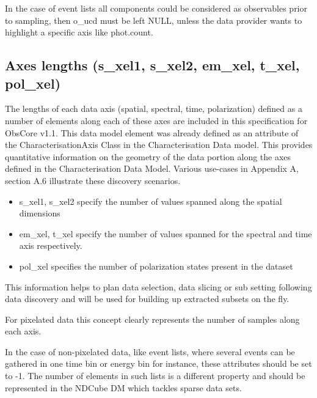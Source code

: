 \documentclass[11pt,a4paper]{ivoa}
\begin{document}
In the case of event lists all components could be considered as observables prior to sampling, then o\_ucd must be left
NULL, unless the data provider wants to highlight a specific axis like phot.count.

\subsection{Axes lengths (s\_xel1, s\_xel2, em\_xel, t\_xel, pol\_xel)}
The lengths of each data axis (spatial, spectral, time, polarization) defined as a number of elements along each of
these axes are included in this specification for ObsCore v1.1. This data model element was already defined as an
attribute of the CharacterisationAxis Class in the Characterisation Data model. This provides quantitative information
on the geometry of the data portion along the axes defined in the Characterisation Data Model. Various use-cases in
Appendix A, section A.6 illustrate these discovery scenarios.  

\begin{itemize}
\item s\_xel1, s\_xel2  specify the number of values spanned  along the spatial dimensions  
\item em\_xel, t\_xel specify the number of values spanned for the spectral and time axis respectively. 
\item pol\_xel specifies the number of polarization states present in the dataset
\end{itemize}
This information helps to plan data selection, data slicing or sub setting following data discovery and will be used for
building up extracted subsets on the fly. 

For pixelated data this concept clearly represents the number of samples along each axis.

In the case of non-pixelated data, like event lists, where several events can be gathered in one time bin or energy bin
for instance, these attributes should be set to -1. The number of elements in such lists is a different property and
should be represented in the NDCube DM which tackles sparse data sets.
\end{document}
